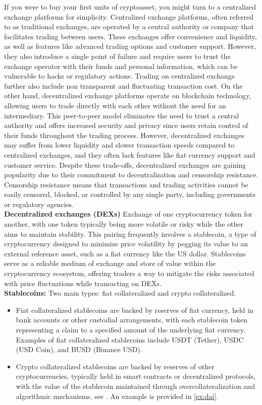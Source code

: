 If you were to buy your first units of cryptoasset, you might turn to a centralized exchange platforms for simplicity. Centralized exchange platforms, often referred to as traditional exchanges, are operated by a central authority or company that facilitates trading between users. These exchanges offer convenience and liquidity, as well as features like advanced trading options and customer support. However, they also introduce a single point of failure and require users to trust the exchange operator with their funds and personal information, which can be vulnerable to hacks or regulatory actions. Trading on centralized exchange further also include non transparent and fluctuating transaction cost. On the other hand, decentralized exchange platforms operate on blockchain technology, allowing users to trade directly with each other without the need for an intermediary. This peer-to-peer model eliminates the need to trust a central authority and offers increased security and privacy since users retain control of their funds throughout the trading process. However, decentralized exchanges may suffer from lower liquidity and slower transaction speeds compared to centralized exchanges, and they often lack features like fiat currency support and customer service. Despite these trade-offs, decentralized exchanges are gaining popularity due to their commitment to decentralization and censorship resistance. Censorship resistance means that transactions and trading activities cannot be easily censored, blocked, or controlled by any single party, including governments or regulatory agencies.\\

\noindent \textbf{Decentralized exchanges (DEXs)} Exchange of one cryptocurrency token for another, with one token typically being more volatile or risky while the other aims to maintain stability. This pairing frequently involves a stablecoin, a type of cryptocurrency designed to minimize price volatility by pegging its value to an external reference asset, such as a fiat currency like the US dollar. Stablecoins serve as a reliable medium of exchange and store of value within the cryptocurrency ecosystem, offering traders a way to mitigate the risks associated with price fluctuations while transacting on DEXs.\\

\noindent \textbf{Stablecoins:} Two main types: fiat collateralized and crypto collateralized. 
\begin{itemize}
  \item Fiat collateralized stablecoins are backed by reserves of fiat currency, held in bank accounts or other custodial arrangements, with each stablecoin token representing a claim to a specified amount of the underlying fiat currency. Examples of fiat collateralized stablecoins include USDT (Tether), USDC (USD Coin), and BUSD (Binance USD). 
  \item Crypto collateralized stablecoins are backed by reserves of other cryptocurrencies, typically held in smart contracts or decentralized protocols, with the value of the stablecoin maintained through overcollateralization and algorithmic mechanisms, see \citet{Moin2020}. An example is provided in \cref{ex:dai}.
\end{itemize}

